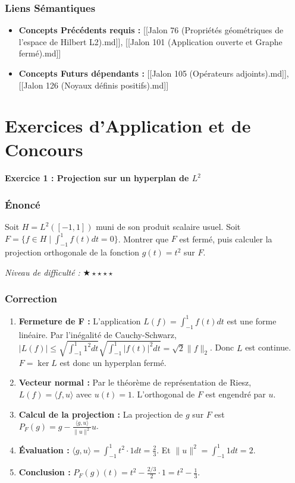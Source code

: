 \documentclass[11pt,a4paper]{article}
\begin{document}
\section{Liens Sémantiques}

\begin{itemize}
\item \textbf{Concepts Précédents requis :} [[Jalon 76 (Propriétés géométriques de l'espace de Hilbert L2).md]], [[Jalon 101 (Application ouverte et Graphe fermé).md]]
\item \textbf{Concepts Futurs dépendants :} [[Jalon 105 (Opérateurs adjoints).md]], [[Jalon 126 (Noyaux définis positifs).md]]
\end{itemize}


\newpage
\part{Exercices d'Application et de Concours}

\subsection*{Exercice 1 : Projection sur un hyperplan de $L^2$}

\section{Énoncé}

Soit $H = L^2([-1, 1])$ muni de son produit scalaire usuel. Soit $F = \{f \in H \mid \int_{-1}^1 f(t) dt = 0\}$. Montrer que $F$ est fermé, puis calculer la projection orthogonale de la fonction $g(t) = t^2$ sur $F$.

\textit{Niveau de difficulté :} $\bigstar\star\star\star\star$

\section{Correction}

\begin{enumerate}
\item \textbf{Fermeture de F :} L'application $L(f) = \int_{-1}^1 f(t) dt$ est une forme linéaire. Par l'inégalité de Cauchy-Schwarz, $|L(f)| \le \sqrt{\int_{-1}^1 1^2 dt} \sqrt{\int_{-1}^1 |f(t)|^2 dt} = \sqrt{2} \|f\|_2$. Donc $L$ est continue. $F = \ker L$ est donc un hyperplan fermé.
\item \textbf{Vecteur normal :} Par le théorème de représentation de Riesz, $L(f) = \langle f, u \rangle$ avec $u(t) = 1$. L'orthogonal de $F$ est engendré par $u$.
\item \textbf{Calcul de la projection :} La projection de $g$ sur $F$ est $P_F(g) = g - \frac{\langle g, u \rangle}{\|u\|^2} u$.
\item \textbf{Évaluation :} $\langle g, u \rangle = \int_{-1}^1 t^2 \cdot 1 dt = \frac{2}{3}$. Et $\|u\|^2 = \int_{-1}^1 1 dt = 2$.
\item \textbf{Conclusion :} $P_F(g)(t) = t^2 - \frac{2/3}{2} \cdot 1 = t^2 - \frac{1}{3}$.
\end{enumerate}
\end{document}
